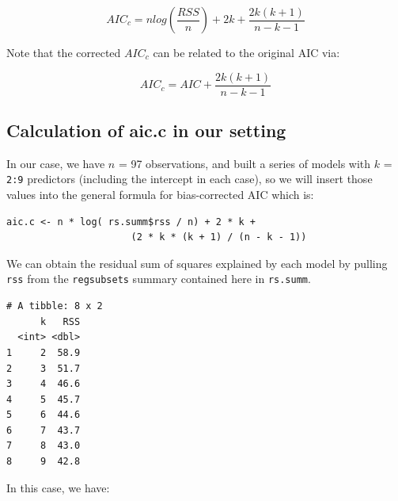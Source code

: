 \documentclass[]{book}
\newenvironment{Shaded}{\begin{snugshade}}{\end{snugshade}}
\newcommand{\KeywordTok}[1]{\textcolor[rgb]{0.13,0.29,0.53}{\textbf{#1}}}
\newcommand{\DataTypeTok}[1]{\textcolor[rgb]{0.13,0.29,0.53}{#1}}
\newcommand{\DecValTok}[1]{\textcolor[rgb]{0.00,0.00,0.81}{#1}}
\newcommand{\OperatorTok}[1]{\textcolor[rgb]{0.81,0.36,0.00}{\textbf{#1}}}
\newcommand{\NormalTok}[1]{#1}
\theoremstyle{definition}
\theoremstyle{definition}
\theoremstyle{definition}
\theoremstyle{remark}
\begin{document}
\[
AIC_c = n log(\frac{RSS}{n}) + 2k + \frac{2k (k+1)}{n-k-1}
\]

Note that the corrected \(AIC_c\) can be related to the original AIC
via:

\[
AIC_c = AIC + \frac{2k (k+1)}{n - k - 1}
\]

\subsection{Calculation of aic.c in our
setting}\label{calculation-of-aic.c-in-our-setting}

In our case, we have \(n\) = 97 observations, and built a series of
models with \(k\) = \texttt{2:9} predictors (including the intercept in
each case), so we will insert those values into the general formula for
bias-corrected AIC which is:

\begin{verbatim}
aic.c <- n * log( rs.summ$rss / n) + 2 * k + 
                      (2 * k * (k + 1) / (n - k - 1))
\end{verbatim}

We can obtain the residual sum of squares explained by each model by
pulling \texttt{rss} from the \texttt{regsubsets} summary contained here
in \texttt{rs.summ}.

\begin{Shaded}
\end{Shaded}

\begin{verbatim}
# A tibble: 8 x 2
      k   RSS
  <int> <dbl>
1     2  58.9
2     3  51.7
3     4  46.6
4     5  45.7
5     6  44.6
6     7  43.7
7     8  43.0
8     9  42.8
\end{verbatim}

In this case, we have:
\end{document}
